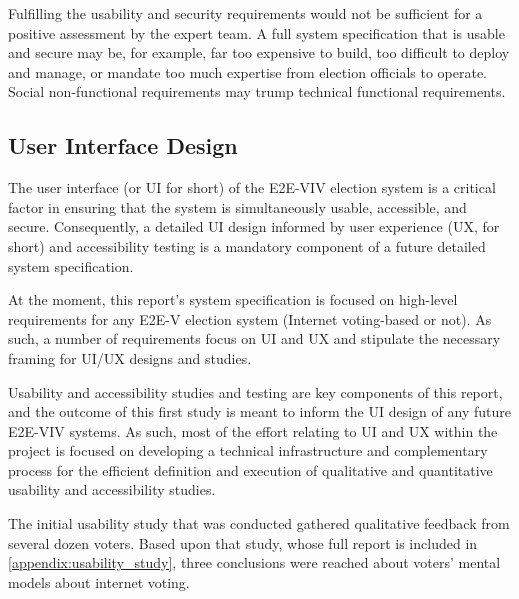 Fulfilling the usability and security requirements would not be
sufficient for a positive assessment by the expert team. A full system
specification that is usable and secure may be, for example, far too
expensive to build, too difficult to deploy and manage, or mandate too
much expertise from election officials to operate. Social
non-functional requirements may trump technical functional
requirements.

\subsection{User Interface Design}
\label{sec:user-interf-design}

The user interface (or UI for short) of the E2E-VIV election system is
a critical factor in ensuring that the system is simultaneously
usable, accessible, and secure. Consequently, a detailed UI design
informed by user experience (UX, for short) and accessibility testing
is a mandatory component of a future detailed system specification.

At the moment, this report's system specification is focused on
high-level requirements for any E2E-V election system (Internet
voting-based or not).  As such, a number of requirements focus on UI
and UX and stipulate the necessary framing for UI/UX designs and
studies.

Usability and accessibility studies and testing are key components of
this report, and the outcome of this first study is meant to inform
the UI design of any future E2E-VIV systems. As such, most of the
effort relating to UI and UX within the project is focused on
developing a technical infrastructure and complementary process for
the efficient definition and execution of qualitative and quantitative
usability and accessibility studies.

The initial usability study that was conducted gathered qualitative
feedback from several dozen voters.  Based upon that study, whose full
report is included in \autoref{appendix:usability_study}, three
conclusions were reached about voters' mental models about internet
voting.

